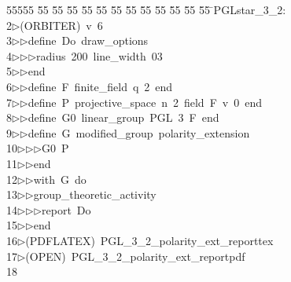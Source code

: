 %
%
\begin{tabbing}
55555 \= 55 \= 55 \= 55 \= 55 \= 55 \= 55 \= 55 \= 55 \= 55 \= 55 \= 55 \= 55 \= \>PGLstar\_3\_2:\\[0pt]
2\>$\triangleright$\>(ORBITER)\ v\ 6\ \\[0pt]
3\>$\triangleright$\>$\triangleright$\>define\ Do\ draw\_options\ \\[0pt]
4\>$\triangleright$\>$\triangleright$\>$\triangleright$\>radius\ 200\ line\_width\ 03\ \\[0pt]
5\>$\triangleright$\>$\triangleright$\>end\ \\[0pt]
6\>$\triangleright$\>$\triangleright$\>define\ F\ finite\_field\ q\ 2\ end\ \\[0pt]
7\>$\triangleright$\>$\triangleright$\>define\ P\ projective\_space\ n\ 2\ field\ F\ v\ 0\ end\ \\[0pt]
8\>$\triangleright$\>$\triangleright$\>define\ G0\ linear\_group\ PGL\ 3\ F\ end\ \\[0pt]
9\>$\triangleright$\>$\triangleright$\>define\ G\ modified\_group\ polarity\_extension\ \\[0pt]
10\>$\triangleright$\>$\triangleright$\>$\triangleright$\>G0\ P\ \\[0pt]
11\>$\triangleright$\>$\triangleright$\>end\ \\[0pt]
12\>$\triangleright$\>$\triangleright$\>with\ G\ do\ \\[0pt]
13\>$\triangleright$\>$\triangleright$\>group\_theoretic\_activity\ \\[0pt]
14\>$\triangleright$\>$\triangleright$\>$\triangleright$\>report\ Do\ \\[0pt]
15\>$\triangleright$\>$\triangleright$\>end\\[0pt]
16\>$\triangleright$\>(PDFLATEX)\ PGL\_3\_2\_polarity\_ext\_reporttex\\[0pt]
17\>$\triangleright$\>(OPEN)\ PGL\_3\_2\_polarity\_ext\_reportpdf\\[0pt]
18\>\end{tabbing}
